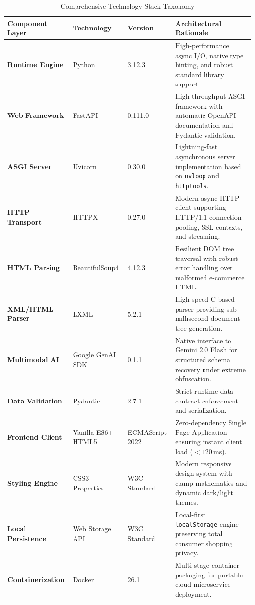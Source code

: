 \documentclass[12pt,a4paper,oneside]{report}
\begin{document}
\begin{table}[h!]
\centering
\small
\caption{Comprehensive Technology Stack Taxonomy}
\label{tab:tech_stack}
\begin{tabularx}{\textwidth}{p{3.2cm} p{2.8cm} p{2.5cm} X}
\toprule
\textbf{Component Layer} & \textbf{Technology} & \textbf{Version} & \textbf{Architectural Rationale} \\
\midrule
\textbf{Runtime Engine} & Python & 3.12.3 & High-performance async I/O, native type hinting, and robust standard library support. \\
\textbf{Web Framework} & FastAPI & 0.111.0 & High-throughput ASGI framework with automatic OpenAPI documentation and Pydantic validation. \\
\textbf{ASGI Server} & Uvicorn & 0.30.0 & Lightning-fast asynchronous server implementation based on \texttt{uvloop} and \texttt{httptools}. \\
\textbf{HTTP Transport} & HTTPX & 0.27.0 & Modern async HTTP client supporting HTTP/1.1 connection pooling, SSL contexts, and streaming. \\
\textbf{HTML Parsing} & BeautifulSoup4 & 4.12.3 & Resilient DOM tree traversal with robust error handling over malformed e-commerce HTML. \\
\textbf{XML/HTML Parser} & LXML & 5.2.1 & High-speed C-based parser providing sub-millisecond document tree generation. \\
\textbf{Multimodal AI} & Google GenAI SDK & 0.1.1 & Native interface to Gemini 2.0 Flash for structured schema recovery under extreme obfuscation. \\
\textbf{Data Validation} & Pydantic & 2.7.1 & Strict runtime data contract enforcement and serialization. \\
\textbf{Frontend Client} & Vanilla ES6+ HTML5 & ECMAScript 2022 & Zero-dependency Single Page Application ensuring instant client load ($<120$\,ms). \\
\textbf{Styling Engine} & CSS3 Properties & W3C Standard & Modern responsive design system with clamp mathematics and dynamic dark/light themes. \\
\textbf{Local Persistence} & Web Storage API & W3C Standard & Local-first \texttt{localStorage} engine preserving total consumer shopping privacy. \\
\textbf{Containerization} & Docker & 26.1 & Multi-stage container packaging for portable cloud microservice deployment. \\
\bottomrule
\end{tabularx}
\end{table}
\end{document}
